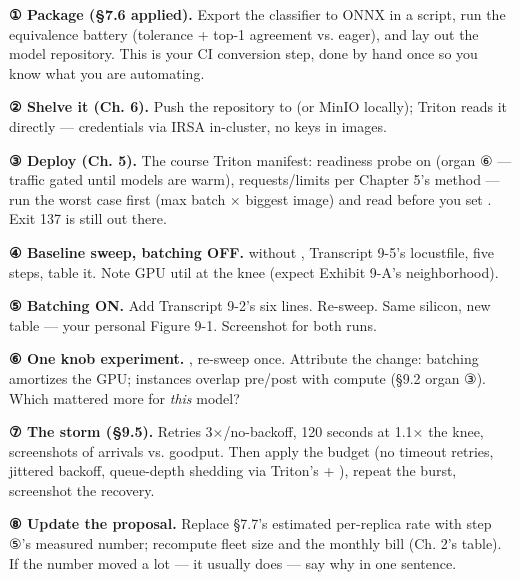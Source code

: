 \begin{tbbitemize}
  \item \textbf{① Package (§7.6 applied).} Export the classifier to ONNX in a script, run the equivalence battery (tolerance + top-1 agreement vs. eager), and lay out the model repository. This is your CI conversion step, done by hand once so you know what you are automating.
  \item \textbf{② Shelve it (Ch. 6).} Push the repository to  (or MinIO locally); Triton reads it directly — credentials via IRSA in-cluster, no keys in images.
  \item \textbf{③ Deploy (Ch. 5).} The course Triton manifest: readiness probe on  (organ ⑥ — traffic gated until models are warm), requests/limits per Chapter 5's method — run the worst case first (max batch × biggest image) and read  before you set . Exit 137 is still out there.
  \item \textbf{④ Baseline sweep, batching OFF.}  without , Transcript 9-5's locustfile, five steps, table it. Note GPU util at the knee (expect Exhibit 9-A's neighborhood).
  \item \textbf{⑤ Batching ON.} Add Transcript 9-2's six lines. Re-sweep. Same silicon, new table — your personal Figure 9-1. Screenshot  for both runs.
  \item \textbf{⑥ One knob experiment.} , re-sweep once. Attribute the change: batching amortizes the GPU; instances overlap pre/post with compute (§9.2 organ ③). Which mattered more for \textit{this} model?
  \item \textbf{⑦ The storm (§9.5).} Retries 3×/no-backoff, 120 seconds at 1.1× the knee, screenshots of arrivals vs. goodput. Then apply the budget (no timeout retries, jittered backoff, queue-depth shedding via Triton's  + ), repeat the burst, screenshot the recovery.
  \item \textbf{⑧ Update the proposal.} Replace §7.7's estimated per-replica rate with step ⑤'s measured number; recompute fleet size and the monthly bill (Ch. 2's table). If the number moved a lot — it usually does — say why in one sentence.
\end{tbbitemize}

